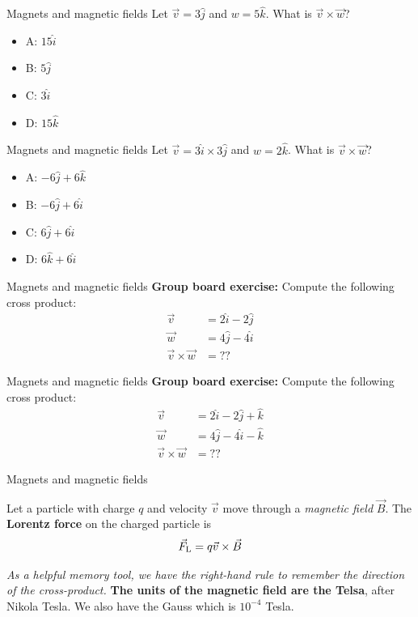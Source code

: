 \documentclass{beamer}
\begin{document}
\begin{frame}{Magnets and magnetic fields}
Let $\vec{v} = 3\hat{j}$ and $w = 5 \hat{k}$.  What is $\vec{v} \times \vec{w}$?
\begin{itemize}
\item A: $15 \hat{i}$
\item B: $5 \hat{j}$
\item C: $3 \hat{i}$
\item D: $15 \hat{k}$
\end{itemize}
\end{frame}

\begin{frame}{Magnets and magnetic fields}
Let $\vec{v} = 3\hat{i} \times 3\hat{j}$ and $w = 2 \hat{k}$.  What is $\vec{v} \times \vec{w}$?
\begin{itemize}
\item A: $-6 \hat{j} + 6\hat{k}$
\item B: $-6 \hat{j} + 6\hat{i}$
\item C: $6 \hat{j} + 6\hat{i}$
\item D: $6 \hat{k} + 6\hat{i}$
\end{itemize}
\end{frame}

\begin{frame}{Magnets and magnetic fields}
\textbf{Group board exercise:} Compute the following cross product:
\begin{align}
\vec{v} &= 2\hat{i}-2\hat{j} \\
\vec{w} &= 4\hat{j}-4\hat{i} \\
\vec{v} \times \vec{w} &= ??
\end{align}
\end{frame}

\begin{frame}{Magnets and magnetic fields}
\textbf{Group board exercise:} Compute the following cross product:
\begin{align}
\vec{v} &= 2\hat{i}-2\hat{j}+\hat{k} \\
\vec{w} &= 4\hat{j}-4\hat{i}-\hat{k} \\
\vec{v} \times \vec{w} &= ??
\end{align}
\end{frame}

\begin{frame}{Magnets and magnetic fields}
\begin{tcolorbox}[colback=white,colframe=red!40!blue,title=The Lorentz Force]
\alert{Let a particle with charge $q$ and velocity $\vec{v}$ move through a \textit{magnetic field} $\vec{B}$.  The \textbf{Lorentz force} on the charged particle is
\begin{equation}
\vec{F}_{\rm L} = q\vec{v} \times \vec{B}
\label{eq:Lorentz}
\end{equation}}
\end{tcolorbox}
\textit{As a helpful memory tool, we have the right-hand rule to remember the direction of the cross-product.}  \textbf{The units of the magnetic field are the Telsa}, after Nikola Tesla.  We also have the Gauss which is $10^{-4}$ Tesla.
\end{frame}
\end{document}
